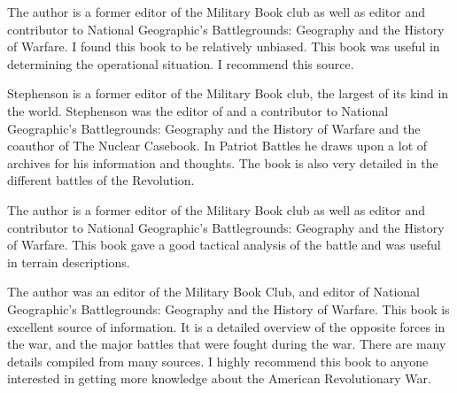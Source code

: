 The author is a former editor of the Military Book club as well
as editor and contributor to National Geographic's Battlegrounds: Geography and
the History of Warfare. I found this book to be relatively unbiased.  This book
was useful in determining the operational situation.  I recommend this source.

Stephenson is a former editor of the Military Book club, the largest of its
kind in the world. Stephenson was the editor of and a contributor to National
Geographic's Battlegrounds: Geography and the History of Warfare and the
coauthor of The Nuclear Casebook. In Patriot Battles he draws upon a lot of
archives for his information and thoughts. The book is also very detailed in
the different battles of the Revolution.

The author is a former editor of the Military Book club as well as editor and
contributor to National Geographic's Battlegrounds: Geography and the History
of Warfare.  This book gave a good tactical analysis of the battle and was
useful in terrain descriptions.

The author was an editor of the Military Book Club, and editor of National
Geographic's Battlegrounds: Geography and the History of Warfare. This book is
excellent source of information. It is a detailed overview of the opposite
forces in the war, and the major battles that were fought during the war. There
are many details compiled from many sources. I highly recommend this book to
anyone interested in getting more knowledge about the American Revolutionary
War.                        

